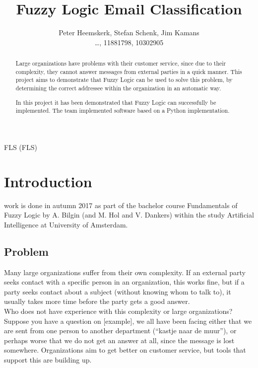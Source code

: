\documentclass[journal]{IEEEtran}
\begin{document}
\title{Fuzzy Logic Email Classification}
\author{Peter Heemskerk, Stefan Schenk, Jim Kamans\\\dots, 11881798, 10302905}


\maketitle

\begin{abstract}
Large organizations have problems with their customer service, since due to their complexity, they cannot answer messages from external parties in a quick manner. This project aims to demonstrate that Fuzzy Logic can be used to solve this problem, by determining the correct addressee within the organization in an automatic way.

In this project it has been demonstrated that Fuzzy Logic can successfully be implemented. The team implemented software based on a Python implementation.
\end{abstract}

\begin{IEEEkeywords}
FLS (FLS)
\end{IEEEkeywords}

\section{Introduction}
 work is done in autumn 2017 as part of the bachelor course Fundamentals of Fuzzy Logic by A. Bilgin (and  M. Hol and V. Dankers) within the study Artificial Intelligence at University of Amsterdam.

\subsection{Problem}
Many large organizations suffer from their own complexity. If an external party seeks contact with a specific person in an organization, this works fine, but if a party seeks contact about a subject (without knowing whom to talk to), it usually takes more time before the party gets a good answer. \\

Who does not have experience with this complexity or large organizations? Suppose you have a question on [example], we all have been facing either that we are sent from one person to another department (``kastje naar de muur''), or perhaps worse that we do not get an answer at all, since the message is lost somewhere. Organizations aim to get better on customer service, but tools that support this are building up. \\
\end{document}
